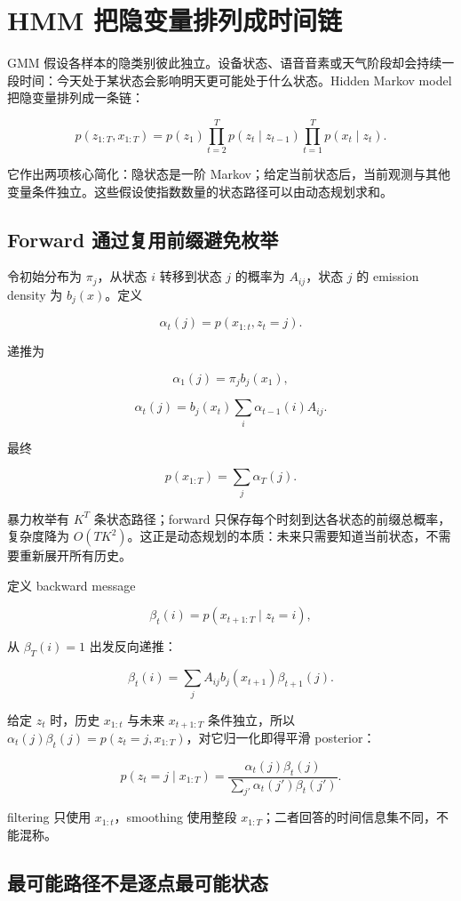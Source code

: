 \section{HMM 把隐变量排列成时间链}

GMM 假设各样本的隐类别彼此独立。设备状态、语音音素或天气阶段却会持续一段时间：今天处于某状态会影响明天更可能处于什么状态。Hidden Markov model 把隐变量排列成一条链：

\[
p(z_{1:T},x_{1:T})
=p(z_1)
\prod_{t=2}^Tp(z_t\mid z_{t-1})
\prod_{t=1}^Tp(x_t\mid z_t).
\]

它作出两项核心简化：隐状态是一阶 Markov；给定当前状态后，当前观测与其他变量条件独立。这些假设使指数数量的状态路径可以由动态规划求和。

\subsection{Forward 通过复用前缀避免枚举}

令初始分布为 \(\pi_j\)，从状态 \(i\) 转移到状态 \(j\) 的概率为 \(A_{ij}\)，状态 \(j\) 的 emission density 为 \(b_j(x)\)。定义

\[
\alpha_t(j)=p(x_{1:t},z_t=j).
\]

递推为

\[
\alpha_1(j)=\pi_jb_j(x_1),
\]

\[
\alpha_t(j)
=b_j(x_t)\sum_i\alpha_{t-1}(i)A_{ij}.
\]

最终

\[
p(x_{1:T})=\sum_j\alpha_T(j).
\]

暴力枚举有 \(K^T\) 条状态路径；forward 只保存每个时刻到达各状态的前缀总概率，复杂度降为 \(O(TK^2)\)。这正是动态规划的本质：未来只需要知道当前状态，不需要重新展开所有历史。

定义 backward message

\[
\beta_t(i)=p(x_{t+1:T}\mid z_t=i),
\]

从 \(\beta_T(i)=1\) 出发反向递推：

\[
\beta_t(i)
=\sum_j A_{ij}b_j(x_{t+1})\beta_{t+1}(j).
\]

给定 \(z_t\) 时，历史 \(x_{1:t}\) 与未来 \(x_{t+1:T}\) 条件独立，所以 \(\alpha_t(j)\beta_t(j)=p(z_t=j,x_{1:T})\)，对它归一化即得平滑 posterior：

\[
p(z_t=j\mid x_{1:T})
=\frac{\alpha_t(j)\beta_t(j)}
{\sum_{j'}\alpha_t(j')\beta_t(j')}.
\]

filtering 只使用 \(x_{1:t}\)，smoothing 使用整段 \(x_{1:T}\)；二者回答的时间信息集不同，不能混称。

\subsection{最可能路径不是逐点最可能状态}

